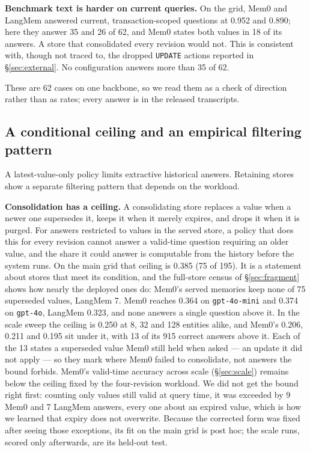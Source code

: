 \documentclass[conference]{IEEEtran}
\begin{document}
\textbf{Benchmark text is harder on current queries.} On the grid, Mem0 and LangMem
answered current, transaction-scoped questions at 0.952 and 0.890; here they
answer 35 and 26 of 62, and Mem0 states both values in 18 of its answers. A
store that consolidated every revision would not. This is consistent with,
though not traced to, the dropped \texttt{UPDATE} actions reported in
\S\ref{sec:external}. No configuration answers more than 35 of 62.

These are 62 cases on one backbone, so we read them as a check of direction
rather than as rates; every answer is in the released transcripts.

\subsection{A conditional ceiling and an empirical filtering pattern}\label{sec:bounds}

A latest-value-only policy limits extractive historical answers. Retaining
stores show a separate filtering pattern that depends on the workload.

\textbf{Consolidation has a ceiling.} A consolidating store replaces a value
when a newer one supersedes it, keeps it when it merely expires, and drops it
when it is purged. For answers restricted to values in the served store, a policy that does
this for every revision cannot answer a valid-time question requiring an
older value, and the share it
could answer is computable from the history before the system runs. On the main
grid that ceiling is 0.385 (75 of 195). It is a statement about stores that
meet its condition, and the full-store census of \S\ref{sec:fragment} shows how
nearly the deployed ones do: Mem0's served memories keep none of 75 superseded
values, LangMem 7.
Mem0 reaches 0.364 on
\texttt{gpt-4o-mini} and 0.374 on \texttt{gpt-4o}, LangMem 0.323, and none
answers a single question above it. In the scale sweep the ceiling is 0.250 at
8, 32 and 128 entities alike, and Mem0's 0.206, 0.211 and 0.195 sit under it,
with 13 of its 915 correct answers above it. Each of the 13 states a superseded
value Mem0 still held when asked --- an update it did not apply --- so they mark
where Mem0 failed to consolidate, not answers the bound forbids. Mem0's valid-time accuracy
across scale (\S\ref{sec:scale}) remains below the ceiling fixed by the
four-revision workload. We did not get the bound right first: counting only values still
valid at query time, it was exceeded by 9 Mem0 and 7 LangMem answers, every one
about an expired value, which is how we learned that expiry does not overwrite.
Because the corrected form was fixed after seeing those exceptions, its fit on
the main grid is post hoc; the scale runs, scored only afterwards, are its
held-out test.
\end{document}
